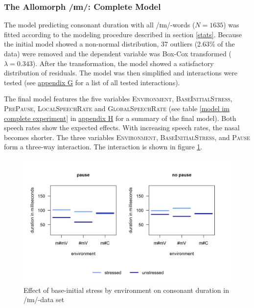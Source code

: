 \subsubsection{The Allomorph /ɪm/: Complete Model}

The model predicting consonant duration with all /ɪm/-words ($N=1635$) was fitted according to the modeling procedure described in section \ref{stats}.  Because the initial model showed a non-normal distribution,  37 outliers (2.63\% of the data) were removed and the dependent variable was Box-Cox transformed ($\lambda = 0.343$). 
After the transformation, the model showed a satisfactory distribution of residuals. The model was then simplified and interactions were tested (see \hyperref[Appendix G Summaries of tested interactions in experimental study]{appendix G} for a list of all tested interactions). 

 
The final model features the five variables \textsc{Environment}, \textsc{BaseInitialStress}, \textsc{PrePause}, \textsc{LocalSpeechRate} and \textsc{GlobalSpeechRate} (see table \ref{model im complete experiment} in \hyperref[Appendix H: Model Summaries Experiment]{appendix H} for a summary of the final model). Both speech rates show the expected effects. With increasing speech rates, the nasal becomes shorter. The three variables \textsc{Environment}, \textsc{BaseInitialStress}, and \textsc{Pause} form a three-way interaction. The interaction is shown in figure \ref{fig:NumNasal imCompleteexperiment}.

\begin{figure} [h!]
	\centering
	\includegraphics [scale=0.6] {images/Experiment/imModelCompleteInterEnvStressPause}
	\vspace*{-0.4cm}
	\caption{Effect of base-initial stress by environment on consonant duration in /ɪm/-data set}
	\label{fig:NumNasal imCompleteexperiment}
\end{figure}


